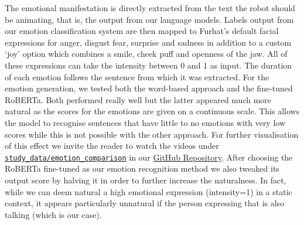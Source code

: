 \documentclass[nomenclature, english, biblatex]{kththesis}
\begin{document}
The emotional manifestation is directly extracted from the text the robot should be animating, that is, the output from our language models. Labels output from our emotion classification system are then mapped to Furhat's default facial expressions for anger, disgust fear, surprise and sadness in addition to a custom `joy' option which combines a smile, cheek puff and openness of the jaw. All of these expressions can take the intensity between 0 and 1 as input. The duration of each emotion follows the sentence from which it was extracted. For the emotion generation, we tested both the word-based approach and the fine-tuned RoBERTa. Both performed really well but the latter appeared much more natural as the scores for the emotions are given on a continuous scale. This allows the model to recognise sentences that have little to no emotions with very low scores while this is not possible with the other approach. For further visualisation of this effect we invite the reader to watch the videos under \href{https://github.com/alessioGalatolo/Furhat-Personality-and-Emotions/tree/main/study_data/emotion_comparison}{\texttt{study_data/emotion_comparison}} in our \href{https://github.com/alessioGalatolo/Furhat-Personality-and-Emotions/}{GitHub Repository}. After choosing the RoBERTa fine-tuned as our emotion recognition method we also tweaked its output score by halving it in order to further increase the naturalness. In fact, while we can deem natural a high emotional expression (intensity=1) in a static context, it appears particularly unnatural if the person expressing that is also talking (which is our case).
\end{document}
